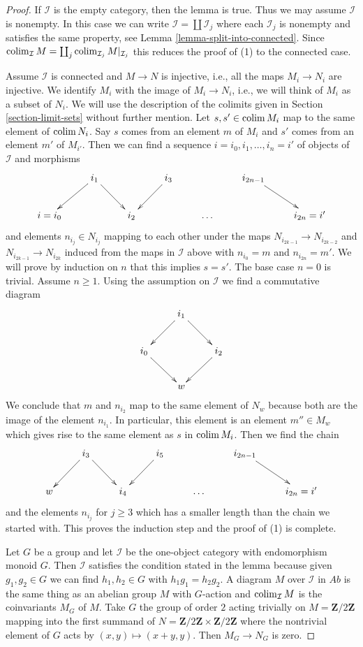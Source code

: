 \begin{proof}
If $\mathcal{I}$ is the empty category, then the lemma is true.
Thus we may assume $\mathcal{I}$ is nonempty. In this case
we can write $\mathcal{I} = \coprod \mathcal{I}_j$ where each
$\mathcal{I}_j$ is nonempty and satisfies the same property, see
Lemma \ref{lemma-split-into-connected}. Since
$\mathop{\mathrm{colim}}\nolimits_\mathcal{I} M = \coprod_j \mathop{\mathrm{colim}}\nolimits_{\mathcal{I}_j} M|_{\mathcal{I}_j}$
this reduces the proof of (1) to the connected case.

\medskip\noindent
Assume $\mathcal{I}$ is connected and $M \to N$ is injective, i.e.,
all the maps $M_i \to N_i$ are injective.
We identify $M_i$ with the image of $M_i \to N_i$, i.e.,
we will think of $M_i$ as a subset of $N_i$.
We will use the description of the colimits given in
Section \ref{section-limit-sets} without further mention.
Let $s, s' \in \mathop{\mathrm{colim}}\nolimits M_i$ map to the same element of $\mathop{\mathrm{colim}}\nolimits N_i$.
Say $s$ comes from an element $m$ of $M_i$ and $s'$ comes from an
element $m'$ of $M_{i'}$. Then we can find a sequence
$i = i_0, i_1, \ldots, i_n = i'$ of objects of $\mathcal{I}$
and morphisms
$$
\xymatrix{
&
i_1 \ar[ld] \ar[rd] & &
i_3 \ar[ld] & &
i_{2n-1} \ar[rd] & \\
i = i_0 & &
i_2 & &
\ldots & &
i_{2n} = i'
}
$$
and elements $n_{i_j} \in N_{i_j}$ mapping to each other under
the maps $N_{i_{2k-1}} \to N_{i_{2k-2}}$ and $N_{i_{2k-1}}
\to N_{i_{2k}}$ induced from the maps in $\mathcal{I}$ above
with $n_{i_0} = m$ and $n_{i_{2n}} = m'$. We will prove by induction
on $n$ that this implies $s = s'$. The base case $n = 0$ is trivial.
Assume $n \geq 1$. Using the assumption on $\mathcal{I}$
we find a commutative diagram
$$
\xymatrix{
& i_1 \ar[ld] \ar[rd] \\
i_0 \ar[rd] & & i_2 \ar[ld] \\
& w
}
$$
We conclude that $m$ and $n_{i_2}$ map to the same element of $N_w$
because both are the image of the element $n_{i_1}$.
In particular, this element is an element $m'' \in M_w$ which
gives rise to the same element as $s$ in $\mathop{\mathrm{colim}}\nolimits M_i$.
Then we find the chain
$$
\xymatrix{
&
i_3 \ar[ld] \ar[rd] & &
i_5 \ar[ld] & &
i_{2n-1} \ar[rd] & \\
w & &
i_4 & &
\ldots & &
i_{2n} = i'
}
$$
and the elements $n_{i_j}$ for $j \geq 3$ which has a smaller length
than the chain we started with. This proves the induction step and the
proof of (1) is complete.

\medskip\noindent
Let $G$ be a group and let $\mathcal{I}$ be the one-object category with
endomorphism monoid $G$. Then $\mathcal{I}$ satisfies the condition stated
in the lemma because given $g_1, g_2 \in G$ we can find $h_1, h_2 \in G$
with $h_1 g_1 = h_2 g_2$. A diagram $M$ over $\mathcal{I}$ in
$\textit{Ab}$ is the same thing as an abelian group $M$ with $G$-action
and $\mathop{\mathrm{colim}}\nolimits_\mathcal{I} M$ is the coinvariants $M_G$ of $M$.
Take $G$ the group of order $2$ acting trivially on $M = \mathbf{Z}/2\mathbf{Z}$
mapping into the first summand of
$N = \mathbf{Z}/2\mathbf{Z} \times \mathbf{Z}/2\mathbf{Z}$
where the nontrivial element of $G$ acts by
$(x, y) \mapsto (x + y, y)$. Then $M_G \to N_G$ is zero.
\end{proof}

